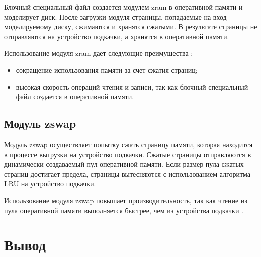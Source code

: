Блочный специальный файл создается модулем zram в оперативной памяти и моделирует диск. После загрузки модуля страницы, попадаемые на вход моделируемому диску, сжимаются и хранятся сжатыми. В результате страницы не отправляются на устройство подкачки, а хранятся в оперативной памяти.

Использование модуля zram дает следующие преимущества \cite{zram}:

\begin{itemize}
	\item сокращение использования памяти за счет сжатия страниц;
	\item высокая скорость операций чтения и записи, так как блочный специальный файл создается в оперативной памяти.
\end{itemize}

\subsection{Модуль zswap}

Модуль zswap осуществляет попытку сжать страницу памяти, которая находится в процессе выгрузки на устройство подкачки. Сжатые страницы отправляются в динамически создаваемый пул оперативной памяти. Если размер пула сжатых страниц достигает предела, страницы вытесняются с использованием алгоритма LRU на устройство подкачки.

Использование модуля zswap повышает производительность, так как чтение из пула оперативной памяти выполняется быстрее, чем из устройства подкачки \cite{zswap}.

\section*{Вывод}
